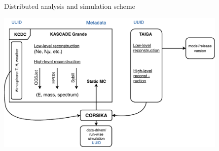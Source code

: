 \documentclass[18pt]{beamer}
\begin{document}
\begin{frame}{Distributed analysis and simulation scheme}
\vspace{-1em}
\begin{center}
\includegraphics[width=0.85\textwidth]{pics/kcdc_scheme_k.pdf}
\end{center}
\end{frame}

%
%




%
%
\end{document}
